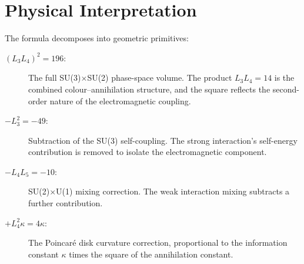 \section{Physical Interpretation}

The formula decomposes into geometric primitives:

\begin{description}
\item[\((L_3 L_4)^2 = 196\):] The full SU(3)\(\times\)SU(2) phase-space
volume.  The product \(L_3 L_4 = 14\) is the combined colour--annihilation
structure, and the square reflects the second-order nature of the
electromagnetic coupling.
\item[\(-L_3^2 = -49\):] Subtraction of the SU(3) self-coupling.  The
strong interaction's self-energy contribution is removed to isolate the
electromagnetic component.
\item[\(-L_4 L_5 = -10\):] SU(2)\(\times\)U(1) mixing correction.  The
weak interaction mixing subtracts a further contribution.
\item[\(+L_4^2\kappa = 4\kappa\):] The Poincar\'{e} disk curvature
correction, proportional to the information constant \(\kappa\) times the
square of the annihilation constant.
\end{description}
